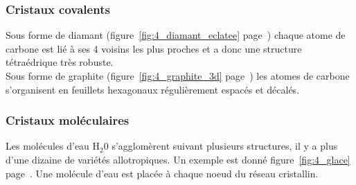 \subsubsection*{Cristaux covalents}
\begin{ex}[Carbone]
    Sous forme de diamant (figure~\ref{fig:4_diamant_eclatee}
    page~\pageref{fig:4_diamant_eclatee}) chaque atome de
    carbone est lié à ses 4 voisins les plus proches et a donc une
    structure tétraédrique très robuste.\\
    Sous forme de graphite (figure~\ref{fig:4_graphite_3d}
    page~\pageref{fig:4_graphite_3d}) les atomes de
    carbone s'organisent en feuillets hexagonaux régulièrement
    espacés et décalés.
\end{ex}


\subsubsection*{Cristaux moléculaires}
\begin{ex}[Eau]
    Les molécules d'eau H$_2$0 s'agglomèrent suivant plusieurs structures,
    il y a plus d'une dizaine de variétés allotropiques.
    Un exemple
    est donné figure~\ref{fig:4_glace} page~\pageref{fig:4_glace}. Une molécule d'eau est placée
    à chaque noeud du réseau cristallin.
\end{ex}

